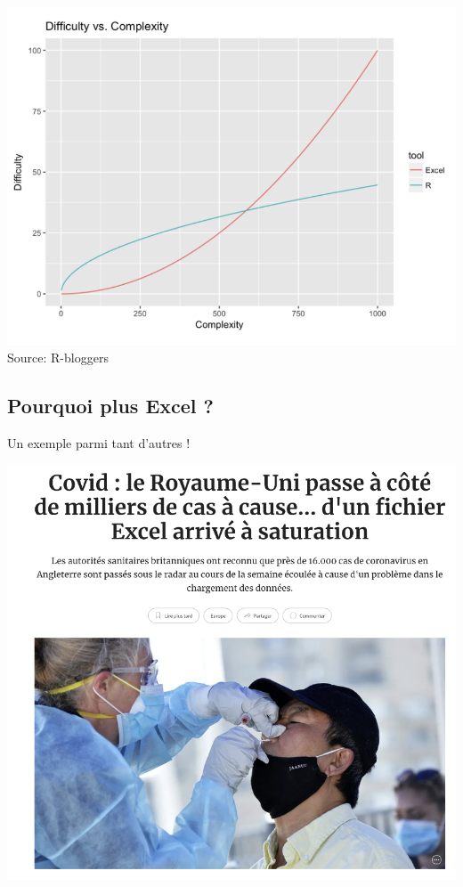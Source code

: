 \documentclass[
]{book}
\begin{document}
\includegraphics{images/rblogger.png}
Source: R-bloggers

\hypertarget{pourquoi-plus-excel}{%
\subsection{Pourquoi plus Excel ?}\label{pourquoi-plus-excel}}

Un exemple parmi tant d'autres !

\includegraphics{images/covid.png}
\end{document}
